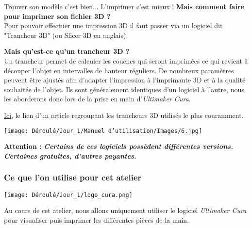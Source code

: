 \begin{flushleft}
    Trouver son modèle c'est bien... L'imprimer c'est mieux ! \textbf{Mais comment faire pour imprimer son fichier 3D ?}\\
    Pour pouvoir effectuer une impression 3D il faut passer via un logiciel dit "Trancheur 3D" (ou Slicer 3D en anglais).\vspace{0.4cm}
    
    \textbf{Mais qu'est-ce qu'un trancheur 3D ?}\\
    Un trancheur permet de calculer les couches qui seront imprimées ce qui revient à découper l'objet en intervalles de hauteur réguliers. De nombreux paramètres peuvent être ajustés afin d'adapter l'impression à l'imprimante 3D et à la qualité souhaitée de l'objet. Ils sont généralement identiques d'un logiciel à l'autre, nous les aborderons donc lors de la prise en main d'\textit{Ultimaker Cura}.
    
    \href{https://all3dp.com/fr/1/meilleur-slicer-3d-logiciel-decoupe-impression-3d/}{Ici}, le lien d'un article regroupant les trancheurs 3D utilisés le plus couramment.\\\vspace{0.2cm}
    
    \begin{multicols}{2}
    \texttt{[image: Déroulé/Jour\_1/Manuel d'utilisation/Images/6.jpg]}
    
    \columnbreak
    
    \textbf{\large Attention : }\textbf{\textit{\large Certains de ces logiciels possèdent différentes versions. Certaines gratuites, d'autres payantes.}}
    \end{multicols}
\end{flushleft}

\subsubsection{Ce que l'on utilise pour cet atelier}
\begin{multicols}{2}
    \texttt{[image: Déroulé/Jour\_1/logo\_cura.png]}\\
    \columnbreak
    \begin{flushleft}
        Au cours de cet atelier, nous allons uniquement utiliser le logiciel \textit{Ultimaker Cura} pour visualiser puis imprimer les différentes pièces de la main.
    \end{flushleft}
\end{multicols}

